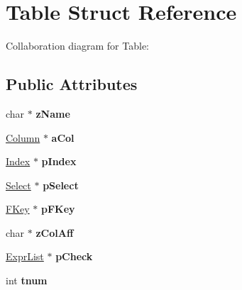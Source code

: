 \hypertarget{structTable}{}\section{Table Struct Reference}
\label{structTable}


Collaboration diagram for Table\+:
\subsection*{Public Attributes}
\begin{DoxyCompactItemize}
\item 
char $\ast$ {\bfseries z\+Name}\hypertarget{structTable_a20ca62607d6da596b1016b76cf677809}{}\label{structTable_a20ca62607d6da596b1016b76cf677809}

\item 
\hyperlink{structColumn}{Column} $\ast$ {\bfseries a\+Col}\hypertarget{structTable_a87ec3b706ecf9545bd9ed582a12ce3e7}{}\label{structTable_a87ec3b706ecf9545bd9ed582a12ce3e7}

\item 
\hyperlink{structIndex}{Index} $\ast$ {\bfseries p\+Index}\hypertarget{structTable_a5dffd0c9e8f0265d6a47b32bd0e6d59f}{}\label{structTable_a5dffd0c9e8f0265d6a47b32bd0e6d59f}

\item 
\hyperlink{structSelect}{Select} $\ast$ {\bfseries p\+Select}\hypertarget{structTable_a39d620182fe2174fc97d04094421fa60}{}\label{structTable_a39d620182fe2174fc97d04094421fa60}

\item 
\hyperlink{structFKey}{F\+Key} $\ast$ {\bfseries p\+F\+Key}\hypertarget{structTable_a37ccce5ee6d530001d49c82788c6616d}{}\label{structTable_a37ccce5ee6d530001d49c82788c6616d}

\item 
char $\ast$ {\bfseries z\+Col\+Aff}\hypertarget{structTable_ac95c0c7b04f2c8367beb98d386d4228f}{}\label{structTable_ac95c0c7b04f2c8367beb98d386d4228f}

\item 
\hyperlink{structExprList}{Expr\+List} $\ast$ {\bfseries p\+Check}\hypertarget{structTable_a4513ad39c4adad36fdf5dd3c6cb70a12}{}\label{structTable_a4513ad39c4adad36fdf5dd3c6cb70a12}

\item 
int {\bfseries tnum}\hypertarget{structTable_aebe1abbfb2fd4b5e5dff8e74a4f3c890}{}\label{structTable_aebe1abbfb2fd4b5e5dff8e74a4f3c890}


\end{DoxyCompactItemize}
